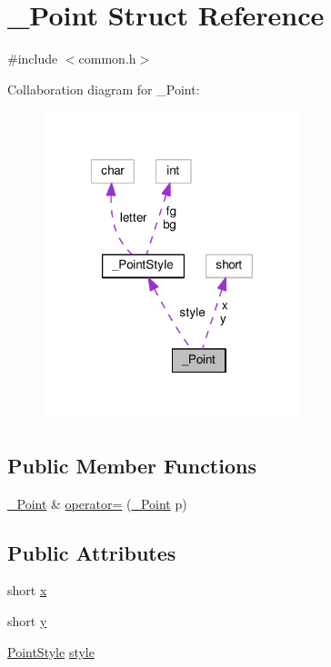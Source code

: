 \hypertarget{struct___point}{\section{\-\_\-\-Point Struct Reference}
\label{struct___point}
}


{\ttfamily \#include $<$common.\-h$>$}



Collaboration diagram for \-\_\-\-Point\-:
\nopagebreak
\begin{figure}[H]
\begin{center}
\leavevmode
\includegraphics[width=212pt]{struct___point__coll__graph}
\end{center}
\end{figure}
\subsection*{Public Member Functions}
\begin{DoxyCompactItemize}
\item 
\hyperlink{struct___point}{\-\_\-\-Point} \& \hyperlink{struct___point_acf5181d8cc6c6bd73a73aa1da2d980cb}{operator=} (\hyperlink{struct___point}{\-\_\-\-Point} p)
\end{DoxyCompactItemize}
\subsection*{Public Attributes}
\begin{DoxyCompactItemize}
\item 
short \hyperlink{struct___point_a1c1cb9f2bfc0c90f1079661912b69e48}{x}
\item 
short \hyperlink{struct___point_af63bdd5a8c2fcf3fc4701a1cc6a421df}{y}
\item 
\hyperlink{common_8h_afd9cb36d6ef309c77ea1e3177e19c623}{Point\-Style} \hyperlink{struct___point_af909fc976d09ac1f11878b4bdcfa10ca}{style}
\end{DoxyCompactItemize}


